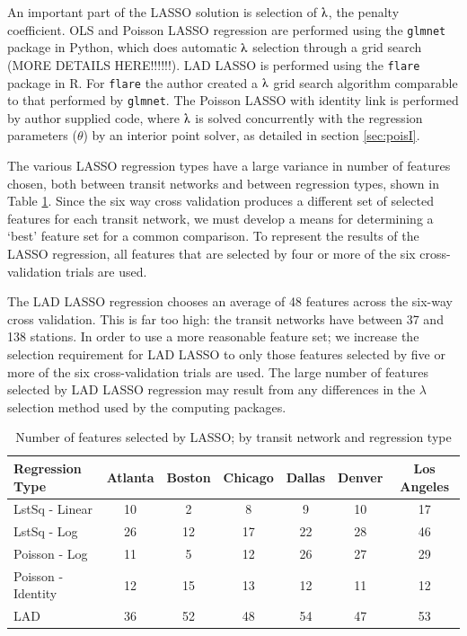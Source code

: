\documentclass[11pt]{article}
\begin{document}
An important part of the LASSO solution is selection of $\lambdaup$, the penalty coefficient. OLS and Poisson LASSO regression are performed using the \texttt{glmnet} package in Python, which does automatic $\lambdaup$ selection through a grid search (MORE DETAILS HERE!!!!!!). LAD LASSO is performed using the \texttt{flare} package in R.  For \texttt{flare} the author created a $\lambdaup$ grid search algorithm comparable to that performed by \texttt{glmnet}. The Poisson LASSO with identity link is performed by author supplied code, where $\lambdaup$ is solved concurrently with the regression parameters ($\theta$) by an interior point solver, as detailed in section \ref{sec:poisI}.  

The various LASSO regression types have a large variance in number of features chosen, both between transit networks and between regression types, shown in Table \ref{tab:lassoFeatNum}. Since the six way cross validation produces a different set of selected features for each transit network, we must develop a means for determining a `best' feature set for a common comparison. To represent the results of the LASSO regression, all features that are selected by four or more of the six cross-validation trials are used. 

The LAD LASSO regression chooses an average of 48 features across the six-way cross validation. This is far too high: the transit networks have between 37 and 138 stations. In order to use a more reasonable feature set; we increase the selection requirement for LAD LASSO to only those features selected by five or more of the six cross-validation trials are used. The large number of features selected by LAD LASSO regression may result from any differences in the $\lambda$ selection method used by the computing packages. 

\begin{table}[H]
\begingroup\fontsize{10}{15}\selectfont
\centering
\begin{tabular}{l|cccccc}
Regression Type&Atlanta&Boston&Chicago&Dallas&Denver&Los Angeles\\
\midrule
LstSq - Linear&10&2&8&9&10&17\\
LstSq - Log&26&12&17&22&28&46\\
Poisson - Log&11&5&12&26&27&29\\
Poisson - Identity&12&15&13&12&11&12\\
LAD&36&52&48&54&47&53\\
\end{tabular}
\caption{Number of features selected by LASSO; by transit network and regression type}\label{tab:lassoFeatNum}
\endgroup
\end{table}
\end{document}
